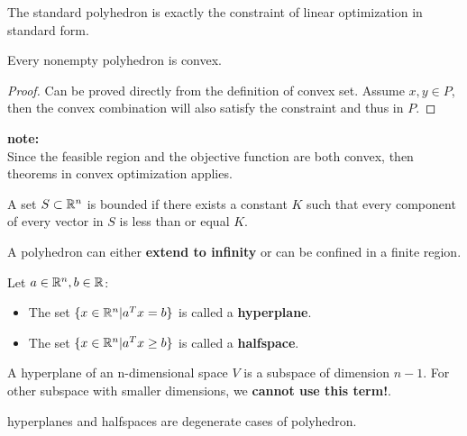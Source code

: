 \begin{refsection}
\begin{remark}
	The standard polyhedron is exactly the constraint of linear optimization in standard form.
\end{remark}


\begin{lemma}
	Every nonempty polyhedron is convex.
\end{lemma}
\begin{proof}
	Can be proved directly from the definition of convex set. Assume $x,y\in P$, then the convex combination will also satisfy the constraint and thus in $P$.
\end{proof}

\begin{mdframed}
	\textbf{note:}\\
	Since the feasible region and the objective function are both convex, then theorems in convex optimization applies. 
\end{mdframed}


\begin{definition}[boundedness]
	\cite[42]{bertsimas1997introduction} A set $S\subset \mathbb{R}^n$ is bounded if there exists a constant $K$ such that every component of every vector in $S$ is less than or equal $K$.
\end{definition}

\begin{remark}
	A polyhedron can either \textbf{extend to infinity} or can be confined in a finite region.
\end{remark}

\begin{definition}
	\cite[42]{bertsimas1997introduction} Let $a \in \mathbb{R}^n,b\in \mathbb{R}$:
	\begin{itemize}
		\item The set $\{x\in \mathbb{R}^n| a^T x =b\}$ is called a \textbf{hyperplane}.
		\item The set $\{x \in \mathbb{R}^n | a^T x \geq b\}$ is called a \textbf{halfspace}.
	\end{itemize}
\end{definition}

\begin{remark}
	A hyperplane of an n-dimensional space $V$ is a subspace of dimension $n − 1$. For other subspace with smaller dimensions, we \textbf{cannot use this term!}.
\end{remark}

\begin{remark}
	hyperplanes and halfspaces are degenerate cases of polyhedron.
\end{remark}



\end{refsection}
